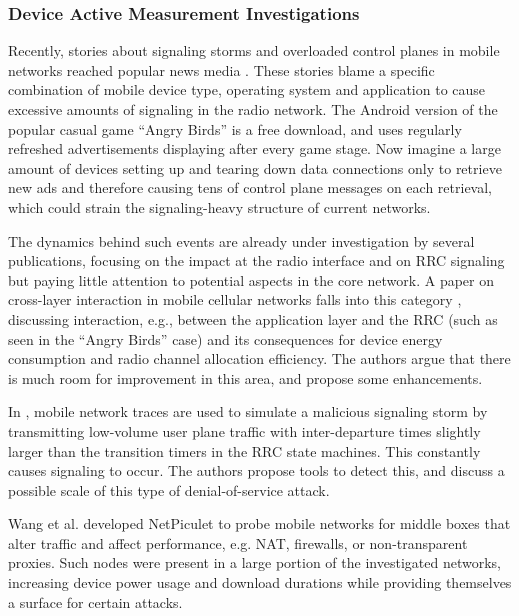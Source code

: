 \subsubsection{Device Active Measurement Investigations}

Recently, stories about signaling storms and overloaded control planes in mobile networks reached popular news media \cite{it2011birdandroid, lt2012docostorm}. These stories blame a specific combination of mobile device type, operating system and application to cause excessive amounts of signaling in the radio network. The Android version of the popular casual game ``Angry Birds'' is a free download, and uses regularly refreshed advertisements displaying after every game stage. Now imagine a large amount of devices setting up and tearing down data connections only to retrieve new ads and therefore causing tens of control plane messages on each retrieval, which could strain the signaling-heavy structure of current networks. 

The dynamics behind such events are already under investigation by several publications, focusing on the impact at the radio interface and on \ac{RRC} signaling but paying little attention to potential aspects in the core network. A paper on cross-layer interaction in mobile cellular networks falls into this category \cite{qian2011profiling}, discussing interaction, e.g., between the application layer and the \ac{RRC} (such as seen in the ``Angry Birds'' case) and its consequences for device energy consumption and radio channel allocation efficiency. The authors argue that there is much room for improvement in this area, and propose some enhancements.


In \cite{lee2007detection}, mobile network traces are used to simulate a malicious signaling storm by transmitting low-volume user plane traffic with inter-departure times slightly larger than the transition timers in the \ac{RRC} state machines. This constantly causes signaling to occur. The authors propose tools to detect this, and discuss a possible scale of this type of denial-of-service attack.

 
Wang et al.\cite{wang2011untold} developed NetPiculet to probe mobile networks for middle boxes that alter traffic and affect performance, e.g. NAT, firewalls, or non-transparent proxies. Such nodes were present in a large portion of the investigated networks, increasing device power usage and download durations while providing themselves a surface for certain attacks.

